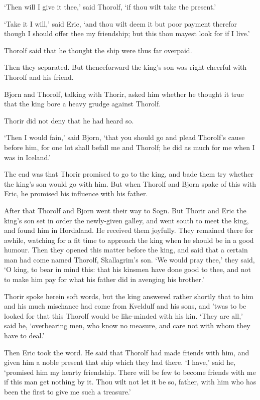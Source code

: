 `Then will I give it thee,' said Thorolf, `if thou wilt take the present.'

`Take it I will,' said Eric, `and thou wilt deem it but poor payment therefor though I should offer thee my friendship; but this thou mayest look for if I live.'

Thorolf said that he thought the ship were thus far overpaid.

Then they separated. But thenceforward the king's son was right cheerful with Thorolf and his friend.

Bjorn and Thorolf, talking with Thorir, asked him whether he thought it true that the king bore a heavy grudge against Thorolf.

Thorir did not deny that he had heard so.

`Then I would fain,' said Bjorn, `that you should go and plead Thorolf's cause before him, for one lot shall befall me and Thorolf; he did as much for me when I was in Iceland.'

The end was that Thorir promised to go to the king, and bade them try whether the king's son would go with him. But when Thorolf and Bjorn spake of this with Eric, he promised his influence with his father.

After that Thorolf and Bjorn went their way to Sogn. But Thorir and Eric the king's son set in order the newly-given galley, and went south to meet the king, and found him in Hordaland. He received them joyfully. They remained there for awhile, watching for a fit time to approach the king when he should be in a good humour. Then they opened this matter before the king, and said that a certain man had come named Thorolf, Skallagrim's son. `We would pray thee,' they said, `O king, to bear in mind this: that his kinsmen have done good to thee, and not to make him pay for what his father did in avenging his brother.'

Thorir spoke herein soft words, but the king answered rather shortly that to him and his much mischance had come from Kveldulf and his sons, and 'twas to be looked for that this Thorolf would be like-minded with his kin. `They are all,' said he, `overbearing men, who know no measure, and care not with whom they have to deal.'

Then Eric took the word. He said that Thorolf had made friends with him, and given him a noble present that ship which they had there. `I have,' said he, `promised him my hearty friendship. There will be few to become friends with me if this man get nothing by it. Thou wilt not let it be so, father, with him who has been the first to give me such a treasure.'

